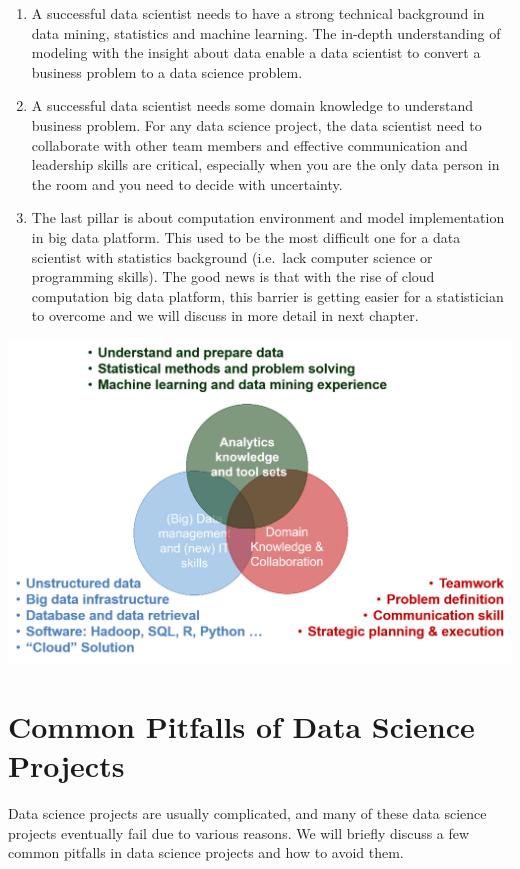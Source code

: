 \documentclass[12pt,]{krantz}
\theoremstyle{definition}
\theoremstyle{definition}
\theoremstyle{definition}
\theoremstyle{remark}
\begin{document}
\begin{enumerate}
\def\labelenumi{(\arabic{enumi})}
\item
  A successful data scientist needs to have a strong technical
  background in data mining, statistics and machine learning. The
  in-depth understanding of modeling with the insight about data enable
  a data scientist to convert a business problem to a data science
  problem.
\item
  A successful data scientist needs some domain knowledge to understand
  business problem. For any data science project, the data scientist
  need to collaborate with other team members and effective
  communication and leadership skills are critical, especially when you
  are the only data person in the room and you need to decide with
  uncertainty.
\item
  The last pillar is about computation environment and model
  implementation in big data platform. This used to be the most
  difficult one for a data scientist with statistics background
  (i.e.~lack computer science or programming skills). The good news is
  that with the rise of cloud computation big data platform, this
  barrier is getting easier for a statistician to overcome and we will
  discuss in more detail in next chapter.
\end{enumerate}

\includegraphics{images/softskill2.png}

\section{Common Pitfalls of Data Science
Projects}\label{common-pitfalls-of-data-science-projects}

Data science projects are usually complicated, and many of these data
science projects eventually fail due to various reasons. We will briefly
discuss a few common pitfalls in data science projects and how to avoid
them.
\end{document}
